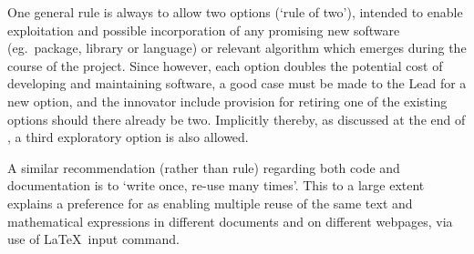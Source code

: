 One general rule is always to allow two options (`rule of two'), intended to enable exploitation 
and possible incorporation of any promising new software (eg.\ package, library or language)
or relevant algorithm which emerges during the course of the project.
Since however, each option doubles the potential cost of developing and maintaining software,
a good case must be made to the Lead for a new option, and the innovator include provision
for retiring one of the existing options should there already be two. Implicitly
thereby, as discussed at the end of , a third exploratory option is also allowed.

A similar recommendation (rather than rule) regarding both code and documentation is to
`write once, re-use many times'.
This to a large extent explains a preference for  as enabling
multiple reuse of the same text and mathematical expressions in different
documents and on different webpages, via use of \LaTeX \ input command.



